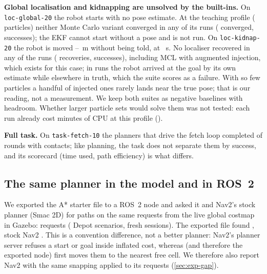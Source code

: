 \textbf{Global localisation and kidnapping are unsolved by the built-ins.} On \texttt{loc-global-20}
the robot starts with no pose estimate. At the teaching profile (\MclParticles{} particles) neither
Monte Carlo variant converged in any of its \GlobalRuns{} runs (\GlobalConverged{} converged,
\GlobalSuccesses{} successes); the EKF cannot start without a pose and is not run. On
\texttt{loc-kidnap-20} the robot is moved \KidnapMinM{}--\KidnapMaxM{}~m without being told, at
\KidnapAtS{}~s. No localiser recovered in any of the \KidnapRuns{} runs (\KidnapRecovered{}
recoveries, \KidnapSuccesses{} successes), including MCL with augmented injection, which exists
for this case; in \KidnapBeliefArrivals{} runs the robot arrived at the goal by its own estimate
while elsewhere in truth, which the suite scores as a failure. With so few particles a handful of
injected ones rarely lands near the true pose; that is our reading, not a measurement. We keep both
suites as negative baselines with headroom. Whether larger particle sets would solve them was not
tested: each run already cost minutes of CPU at this profile ().

\textbf{Full task.} On \texttt{task-fetch-10} the \FetchPlanners{} planners that drive the fetch
loop completed \FetchCompleted{} of \FetchRuns{} rounds with \FetchContacts{} contacts; like
planning, the task does not separate them by success, and its scorecard (time used, path
efficiency) is what differs.





\subsection{The same planner in the model and in ROS~2}\label{sec:exp-r27}
We exported the A* starter file to a ROS~2 node and asked it and Nav2's stock planner (Smac 2D)
for paths on the same requests from the live global costmap in Gazebo: \StackPlanRequests{}
requests (\StackPlanScenarios{} Depot scenarios, \StackPlanSessions{} fresh sessions). The exported file found
\StackAstarPlans{}, stock Nav2 \StackStockPlans{}. This is a convention difference, not a better
planner: Nav2's planner server refuses a start or goal inside inflated cost, whereas \cocolab{}
(and therefore the exported node) first moves them to the nearest free cell. We therefore also
report Nav2 with the same snapping applied to its requests (\cref{sec:exp-gap}).

